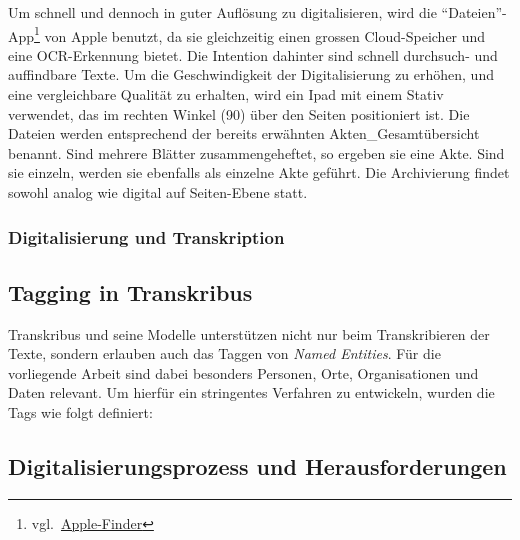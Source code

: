 \documentclass[12pt, a4paper, ngerman, bidi=default]{article}
\begin{document}
    Um schnell und dennoch in guter Auflösung zu digitalisieren, wird die \enquote{Dateien}-App\footnote{vgl.~\href{https://support.apple.com/de-de/guide/preview/prvw28034/mac}{Apple-Finder}} von 
    Apple benutzt, da sie gleichzeitig einen grossen Cloud-Speicher und eine OCR-Erkennung bietet. Die Intention dahinter sind schnell durchsuch- und auffindbare Texte.
    Um die Geschwindigkeit der Digitalisierung zu erhöhen, und eine vergleichbare Qualität zu erhalten, wird ein Ipad mit einem Stativ verwendet, das im rechten Winkel (90\textdegree) über den Seiten positioniert ist. 
    Die Dateien werden entsprechend der bereits erwähnten Akten\_Gesamtübersicht benannt. Sind mehrere Blätter zusammengeheftet, so ergeben sie eine Akte. Sind sie einzeln, werden sie ebenfalls als einzelne Akte geführt. Die Archivierung findet sowohl analog wie digital auf Seiten-Ebene statt.\\
  
    \subsubsection{Digitalisierung und Transkription}
    
    \subsection{Tagging in Transkribus}\label{subsec:TaggingKapitel} 

    Transkribus und seine Modelle unterstützen nicht nur beim Transkribieren der Texte, sondern erlauben auch das Taggen von \textit{Named Entities}.  
    Für die vorliegende Arbeit sind dabei besonders Personen, Orte, Organisationen und Daten relevant.  
    Um hierfür ein stringentes Verfahren zu entwickeln, wurden die Tags wie folgt definiert:
    

\subsection{Digitalisierungsprozess und Herausforderungen}
\end{document}
